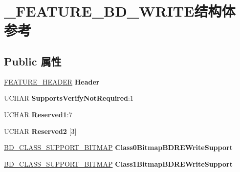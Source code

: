 \hypertarget{struct___f_e_a_t_u_r_e___b_d___w_r_i_t_e}{}\section{\+\_\+\+F\+E\+A\+T\+U\+R\+E\+\_\+\+B\+D\+\_\+\+W\+R\+I\+T\+E结构体 参考}
\label{struct___f_e_a_t_u_r_e___b_d___w_r_i_t_e}
\subsection*{Public 属性}
\begin{DoxyCompactItemize}
\item 
\mbox{\label{struct___f_e_a_t_u_r_e___b_d___w_r_i_t_e_a1e5e55bd374307574e9124f668680618}} 
\hyperlink{struct___f_e_a_t_u_r_e___h_e_a_d_e_r}{F\+E\+A\+T\+U\+R\+E\+\_\+\+H\+E\+A\+D\+ER} {\bfseries Header}
\item 
\mbox{\label{struct___f_e_a_t_u_r_e___b_d___w_r_i_t_e_a4e754826d741d83cf1c6acd3e09aab41}} 
U\+C\+H\+AR {\bfseries Supports\+Verify\+Not\+Required}\+:1
\item 
\mbox{\label{struct___f_e_a_t_u_r_e___b_d___w_r_i_t_e_af2f95a001280aeaf8448cf76738e436f}} 
U\+C\+H\+AR {\bfseries Reserved1}\+:7
\item 
\mbox{\label{struct___f_e_a_t_u_r_e___b_d___w_r_i_t_e_a59ebc08819128455725f8fce986e65ba}} 
U\+C\+H\+AR {\bfseries Reserved2} \mbox{[}3\mbox{]}
\item 
\mbox{\label{struct___f_e_a_t_u_r_e___b_d___w_r_i_t_e_a3b265806adbee1c1d3477232a62f284d}} 
\hyperlink{struct___b_d___c_l_a_s_s___s_u_p_p_o_r_t___b_i_t_m_a_p}{B\+D\+\_\+\+C\+L\+A\+S\+S\+\_\+\+S\+U\+P\+P\+O\+R\+T\+\_\+\+B\+I\+T\+M\+AP} {\bfseries Class0\+Bitmap\+B\+D\+R\+E\+Write\+Support}
\item 
\mbox{\label{struct___f_e_a_t_u_r_e___b_d___w_r_i_t_e_aa501cebd040f7c2d1387f8dcfb5b3db1}} 
\hyperlink{struct___b_d___c_l_a_s_s___s_u_p_p_o_r_t___b_i_t_m_a_p}{B\+D\+\_\+\+C\+L\+A\+S\+S\+\_\+\+S\+U\+P\+P\+O\+R\+T\+\_\+\+B\+I\+T\+M\+AP} {\bfseries Class1\+Bitmap\+B\+D\+R\+E\+Write\+Support}

\end{DoxyCompactItemize}
